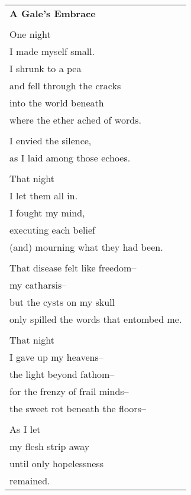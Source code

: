 \documentclass{article}
\begin{document}
\begin{center}
\begin{tabular}{l}
\textbf{A Gale's Embrace} \\
\\
One night \\
I made myself small. \\
I shrunk to a pea \\
and fell through the cracks \\
into the world beneath \\
where the ether ached of words. \\
\\
I envied the silence, \\
as I laid among those echoes. \\
\\
That night \\
I let them all in. \\
I fought my mind, \\
executing each belief \\
(and) mourning what they had been. \\
\\
That disease felt like freedom-- \\
my catharsis-- \\
but the cysts on my skull \\
only spilled the words that entombed me. \\ %
\\
That night \\
I gave up my heavens-- \\
the light beyond fathom-- \\
for the frenzy of frail minds-- \\
the sweet rot beneath the floors-- \\
\\
As I let \\
my flesh strip away \\
until only hopelessness \\
remained. \\
\end{tabular}
\end{center}
\end{document}
